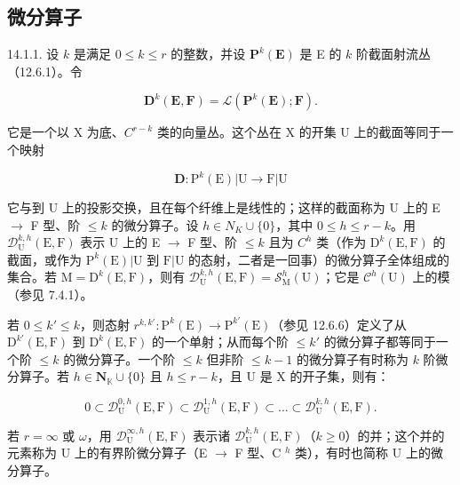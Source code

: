 \subsection{微分算子}

14.1.1. 设 \(k\) 是满足 \(0 \leqslant k \leqslant r\) 的整数，并设 \(\mathbf{P}^k(\mathbf{E})\) 是 E 的 \(k\) 阶截面射流丛（12.6.1）。令

\[
\mathbf {D} ^ {k} (\mathbf {E}, \mathbf {F}) = \mathscr {L} (\mathbf {P} ^ {k} (\mathbf {E}); \mathbf {F}).
\]

它是一个以 X 为底、\(C^{r-k}\) 类的向量丛。这个丛在 X 的开集 U 上的截面等同于一个映射

\[
\mathbf {D}: \mathrm{P} ^ {k} (\mathrm{E}) | \mathrm{U} \rightarrow \mathrm{F} | \mathrm{U}
\]

它与到 U 上的投影交换，且在每个纤维上是线性的；这样的截面称为 U 上的 E \(\to\) F 型、阶 \(\leqslant k\) 的微分算子。设 \(h \in N_{K} \cup \{0\}\)，其中 \(0 \leqslant h \leqslant r-k\)。用 \(\mathcal{D}_{\mathrm{U}}^{k,h}(\mathrm{E}, \mathrm{F})\) 表示 U 上的 E \(\to\) F 型、阶 \(\leqslant k\) 且为 \(C^{h}\) 类（作为 \(\mathrm{D}^{k}(\mathrm{E}, \mathrm{F})\) 的截面，或作为 \(\mathrm{P}^{k}(\mathrm{E})|\mathrm{U}\) 到 \(\mathrm{F}|\mathrm{U}\) 的态射，二者是一回事）的微分算子全体组成的集合。若 \(\mathrm{M} = \mathrm{D}^{k}(\mathrm{E}, \mathrm{F})\)，则有 \(\mathcal{D}_{\mathrm{U}}^{k,h}(\mathrm{E}, \mathrm{F}) = \mathcal{S}_{\mathrm{M}}^{h}(\mathrm{U})\)；它是 \(\mathcal{C}^{h}(\mathrm{U})\) 上的模（参见 7.4.1）。

若 \(0 \leqslant k' \leqslant k\)，则态射 \(r^{k, k'}: \mathrm{P}^{k}(\mathrm{E}) \to \mathrm{P}^{k'}(\mathrm{E})\)（参见 12.6.6）定义了从 \(\mathrm{D}^{k'}(\mathrm{E}, \mathrm{F})\) 到 \(\mathrm{D}^{k}(\mathrm{E}, \mathrm{F})\) 的一个单射；从而每个阶 \(\leqslant k'\) 的微分算子都等同于一个阶 \(\leqslant k\) 的微分算子。一个阶 \(\leqslant k\) 但非阶 \(\leqslant k - 1\) 的微分算子有时称为 \(k\) 阶微分算子。若 \(h \in \mathbf{N}_{\mathbb{K}} \cup \{0\}\) 且 \(h \leqslant r - k\)，且 U 是 X 的开子集，则有：

\[
0 \subset \mathcal {D} _ {\mathrm{U}} ^ {0, h} (\mathrm{E}, \mathrm{F}) \subset \mathcal {D} _ {\mathrm{U}} ^ {1, h} (\mathrm{E}, \mathrm{F}) \subset \dots \subset \mathcal {D} _ {\mathrm{U}} ^ {k, h} (\mathrm{E}, \mathrm{F}).
\]

若 \(r=\infty\) 或 \(\omega\)，用 \(\mathcal{D}_{\mathrm{U}}^{\infty,h}(\mathrm{E},\mathrm{F})\) 表示诸 \(\mathcal{D}_{\mathrm{U}}^{k,h}(\mathrm{E},\mathrm{F})\)（\(k\geqslant0\)）的并；这个并的元素称为 U 上的有界阶微分算子（E \(\rightarrow\) F 型、C \(^{h}\) 类），有时也简称 U 上的微分算子。


